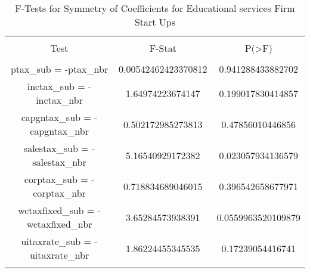 
\begin{table}[!htbp] \centering 
  \caption{F-Tests for Symmetry of Coefficients for Educational services Firm Start Ups} 
  \label{} 
\begin{tabular}{@{\extracolsep{5pt}} ccc} 
\\[-1.8ex]\hline 
\hline \\[-1.8ex] 
Test & F-Stat & P(\textgreater F) \\ 
\hline \\[-1.8ex] 
ptax\_sub = -ptax\_nbr & 0.00542462423370812 & 0.941288433882702 \\ 
inctax\_sub = -inctax\_nbr & 1.64974223674147 & 0.199017830414857 \\ 
capgntax\_sub = -capgntax\_nbr & 0.502172985273813 & 0.47856010446856 \\ 
salestax\_sub = -salestax\_nbr & 5.16540929172382 & 0.023057934136579 \\ 
corptax\_sub = -corptax\_nbr & 0.718834689046015 & 0.396542658677971 \\ 
wctaxfixed\_sub = -wctaxfixed\_nbr & 3.65284573938391 & 0.0559963520109879 \\ 
uitaxrate\_sub = -uitaxrate\_nbr & 1.86224455345535 & 0.17239054416741 \\ 
\hline \\[-1.8ex] 
\end{tabular} 
\end{table} 
